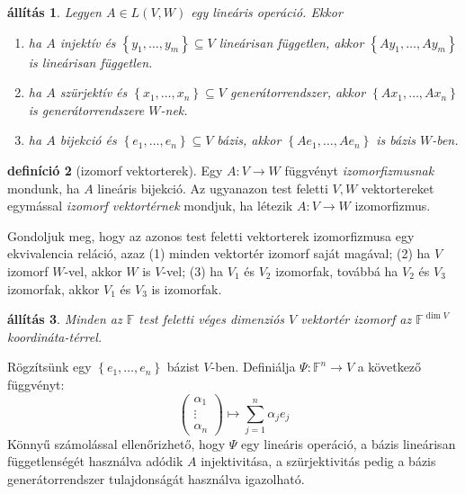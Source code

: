 \documentclass[9pt, a4paper, showtrims]{memoir}
\makeatletter
\renewenvironment{proof}[1][\proofname]
    {\par\pushQED{\qed}%
    \normalfont \topsep6\p@\@plus6\p@\relax
    \trivlist
    \item[\hskip\labelsep
        \itshape
    #1\@addpunct{:}]\ignorespaces}
    {\popQED\endtrivlist\@endpefalse}
\theoremstyle{plain}
\newtheorem{proposition}{állítás}[chapter]
\theoremstyle{remark}
\theoremstyle{definition}
\newtheorem{definition}[proposition]{definíció}
\makeatother
\begin{document}
\begin{proposition}
    Legyen $A\in L\left( V,W \right)$ egy lineáris operáció.
    Ekkor
    \begin{enumerate}
        \item ha $A$ injektív és $\left\{ y_1,\dots,y_m \right\}\subseteq V$
            lineárisan független,
            akkor 
            $\left\{ Ay_1,\dots,Ay_m \right\}$ is lineárisan független.
        \item ha $A$ szürjektív és $\left\{ x_1,\dots,x_n \right\}\subseteq V$
            generátorrendszer,
            akkor 
            $\left\{ Ax_1,\dots,Ax_n \right\}$ is generátorrendszere $W$-nek.
        \item ha $A$ bijekció és $\left\{ e_1,\dots,e_n \right\}\subseteq V$
            bázis,
            akkor 
            $\left\{ Ae_1,\dots,Ae_n \right\}$ is bázis $W$-ben.
            \qedhere
    \end{enumerate}
\end{proposition}
\begin{definition}[izomorf vektorterek]
    Egy $A:V\to W$ függvényt \emph{izomorfizmusnak} mondunk,
    ha $A$ lineáris bijekció.
    Az ugyanazon test feletti $V,W$ vektortereket egymással \emph{izomorf vektortérnek} mondjuk,
    ha létezik $A:V\to W$ izomorfizmus.
\end{definition}
Gondoljuk meg, hogy az azonos test feletti vektorterek izomorfizmusa egy ekvivalencia reláció,
azaz (1) minden vektortér izomorf saját magával; (2) ha $V$ izomorf $W$-vel,
akkor $W$ is $V$-vel; (3) ha $V_1$ és $V_2$ izomorfak, továbbá ha $V_2$ és $V_3$ izomorfak, akkor 
$V_1$ és $V_3$ is izomorfak.
\begin{proposition}
    Minden az $\mathbb{F}$ test feletti véges dimenziós $V$ vektortér izomorf az $\mathbb{F}^{\dim V}$
    koordináta-térrel.
\end{proposition}
\begin{proof}
    Rögzítsünk egy $\left\{ e_1,\dots,e_n \right\}$ bázist $V$-ben.
    Definiálja $\Psi:\mathbb{F}^n\to V$ a következő függvényt:
    \[
        \begin{pmatrix}
            \alpha_1\\ \vdots\\ \alpha_n
        \end{pmatrix}
        \mapsto\sum_{j=1}^n\alpha_je_j
    \]
    Könnyű számolással ellenőrizhető,
    hogy $\Psi$ egy lineáris operáció,
    a bázis lineárisan függetlenségét használva adódik $A$ injektivitása,
    a szürjektivitás pedig a bázis generátorrendszer tulajdonságát használva igazolható.
\end{proof}
\end{document}
